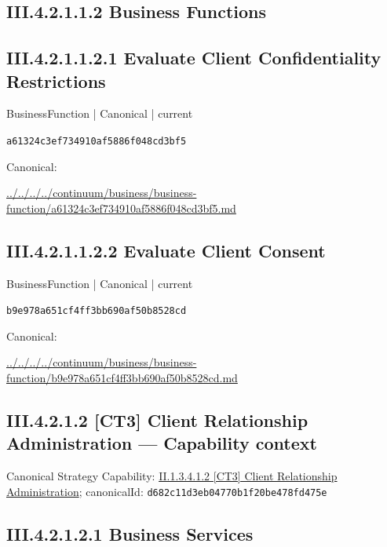 \documentclass[10pt,a4paper]{article}
\begin{document}
\subsection*{III.4.2.1.1.2 Business Functions}
\subsection*{III.4.2.1.1.2.1 Evaluate Client Confidentiality Restrictions}
\label{element-a61324c3ef734910af5886f048cd3bf5}
{\small BusinessFunction | Canonical | current}\par
\texttt{a61324c3ef734910af5886f048cd3bf5}\par
Canonical: \par
{\footnotesize\url{../../../../continuum/business/business-function/a61324c3ef734910af5886f048cd3bf5.md}}\par
\subsection*{III.4.2.1.1.2.2 Evaluate Client Consent}
\label{element-b9e978a651cf4ff3bb690af50b8528cd}
{\small BusinessFunction | Canonical | current}\par
\texttt{b9e978a651cf4ff3bb690af50b8528cd}\par
Canonical: \par
{\footnotesize\url{../../../../continuum/business/business-function/b9e978a651cf4ff3bb690af50b8528cd.md}}\par
\subsection*{III.4.2.1.2 [CT3] Client Relationship Administration — Capability context}
Canonical Strategy Capability: \hyperref[element-d682c11d3eb04770b1f20be478fd475e]{II.1.3.4.1.2 [CT3] Client Relationship Administration}; canonicalId: \texttt{d682c11d3eb04770b1f20be478fd475e}\par
\subsection*{III.4.2.1.2.1 Business Services}
\end{document}
